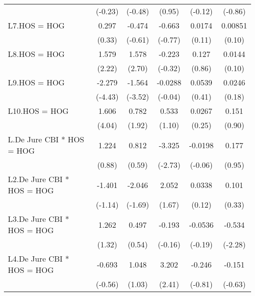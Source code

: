 {\begin{tabular}{l*{5}{c}}
                &  (-0.23)         &  (-0.48)         &   (0.95)         &  (-0.12)         &  (-0.86)         \\
[1em]
L7.HOS = HOG    &    0.297         &   -0.474         &   -0.663         &   0.0174         &  0.00851         \\
                &   (0.33)         &  (-0.61)         &  (-0.77)         &   (0.11)         &   (0.10)         \\
[1em]
L8.HOS = HOG    &    1.579\sym{*}  &    1.578\sym{**} &   -0.223         &    0.127         &   0.0144         \\
                &   (2.22)         &   (2.70)         &  (-0.32)         &   (0.86)         &   (0.10)         \\
[1em]
L9.HOS = HOG    &   -2.279\sym{***}&   -1.564\sym{***}&  -0.0288         &   0.0539         &   0.0246         \\
                &  (-4.43)         &  (-3.52)         &  (-0.04)         &   (0.41)         &   (0.18)         \\
[1em]
L10.HOS = HOG   &    1.606\sym{***}&    0.782         &    0.533         &   0.0267         &    0.151         \\
                &   (4.04)         &   (1.92)         &   (1.10)         &   (0.25)         &   (0.90)         \\
[1em]
L.De Jure CBI * HOS = HOG&    1.224         &    0.812         &   -3.325\sym{**} &  -0.0198         &    0.177         \\
                &   (0.88)         &   (0.59)         &  (-2.73)         &  (-0.06)         &   (0.95)         \\
[1em]
L2.De Jure CBI * HOS = HOG&   -1.401         &   -2.046         &    2.052         &   0.0338         &    0.101         \\
                &  (-1.14)         &  (-1.69)         &   (1.67)         &   (0.12)         &   (0.33)         \\
[1em]
L3.De Jure CBI * HOS = HOG&    1.262         &    0.497         &   -0.193         &  -0.0536         &   -0.534\sym{*}  \\
                &   (1.32)         &   (0.54)         &  (-0.16)         &  (-0.19)         &  (-2.28)         \\
[1em]
L4.De Jure CBI * HOS = HOG&   -0.693         &    1.048         &    3.202\sym{*}  &   -0.246         &   -0.151         \\
                &  (-0.56)         &   (1.03)         &   (2.41)         &  (-0.81)         &  (-0.63)         \\

\end{tabular}}
